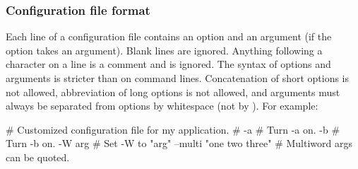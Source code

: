    \subsubsection{Configuration file format}

Each line of a configuration file contains an option and an argument
(if the option takes an argument). Blank lines are ignored.  Anything
following a \ccode{\#} character on a line is a comment and is
ignored. The syntax of options and arguments is stricter than on
command lines.  Concatenation of short options is not allowed,
abbreviation of long options is not allowed, and arguments must always
be separated from options by whitespace (not by \ccode{=}). For
example:

\begin{cchunk}
   # Customized configuration file for my application.
   #
   -a                        # Turn -a on.
   -b                        # Turn -b on.
   -W      arg               # Set -W to "arg"
   --multi "one two three"   # Multiword args can be quoted.
\end{cchunk}



